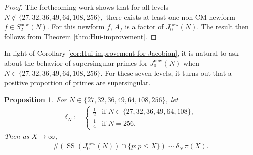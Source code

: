 \documentclass[11pt,letterpaper,reqno]{amsart}
\newtheorem{proposition}[theorem]{Proposition}
\theoremstyle{definition}
\numberwithin{equation}{section}
\numberwithin{figure}{section}
\numberwithin{table}{section}
\newcommand{\nw}{\mathrm{new}}
\begin{document}
\begin{proof}
    The forthcoming work \cite{Mondal2026} shows that for all levels $N \notin \{ 27, 32, 36, 49, 64, 108, 256 \},$ there exists at least one non-CM newform $f \in S_2^{\nw}(N).$ For this newform $f$, $A_f$ is a factor of $J_0^\nw(N).$ The result then follows from Theorem \ref{thm:Hui-improvement}.
\end{proof}


In light of Corollary \ref{cor:Hui-improvement-for-Jacobian}, it is natural to ask about the behavior of supersingular primes for $J_0^\nw(N)$ when $N \in \{27,32,36,49,64,108,256\}$. For these seven levels, it turns out that a positive proportion of primes are supersingular.
\begin{proposition} \label{prop:seven-exceptional-levels}
    For $N \in \{27,32,36,49,64,108,256\}$, let
    \begin{align}
        \delta_N := 
        \begin{cases}
            \frac{1}{2} & \text{if } N \in \{27,32,36,49,64,108\}, \\
            \frac{1}{4} & \text{if } N=256.
        \end{cases}
    \end{align}
    Then as $X \to \infty$,
    \begin{align}
        \# (\operatorname{SS}(J_0^\nw(N)) \cap \{p : p \le X\}) \sim \delta_N \,\pi(X).
    \end{align}
\end{proposition}
\end{document}
